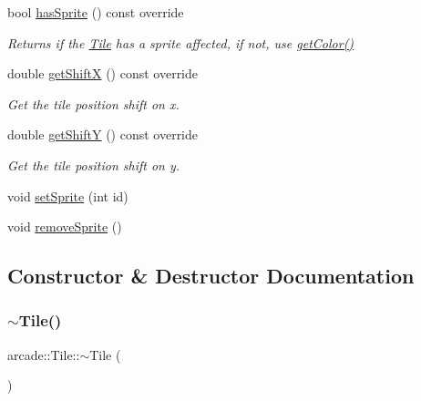 \begin{DoxyCompactItemize}
bool \hyperlink{classarcade_1_1_tile_abb9bfea961e713a36213627d0787aae2}{has\+Sprite} () const override
\begin{DoxyCompactList}\small\item\em Returns if the \hyperlink{classarcade_1_1_tile}{Tile} has a sprite affected, if not, use \hyperlink{classarcade_1_1_tile_a33f158dcb0b991ca565562a41ede70ba}{get\+Color()} \end{DoxyCompactList}\item 
double \hyperlink{classarcade_1_1_tile_a0db817dd3b7e0872e90d703bfea16005}{get\+ShiftX} () const override
\begin{DoxyCompactList}\small\item\em Get the tile position shift on x. \end{DoxyCompactList}\item 
double \hyperlink{classarcade_1_1_tile_aa28fe418563d90bd65e1c58510d28eef}{get\+ShiftY} () const override
\begin{DoxyCompactList}\small\item\em Get the tile position shift on y. \end{DoxyCompactList}\item 
void \hyperlink{classarcade_1_1_tile_a6fbee0e9aec15f1ee8b723776d67d2b4}{set\+Sprite} (int id)
\item 
void \hyperlink{classarcade_1_1_tile_a47d0874b2b1f02719574d1cae49e7a05}{remove\+Sprite} ()
\end{DoxyCompactItemize}


\subsection{Constructor \& Destructor Documentation}
\mbox{\label{classarcade_1_1_tile_a38f5ed9f2ae16dbd42fa736ed5c984a6}} 
\subsubsection{\texorpdfstring{$\sim$\+Tile()}{~Tile()}}
{\footnotesize\ttfamily arcade\+::\+Tile\+::$\sim$\+Tile (\begin{DoxyParamCaption}{ }\end{DoxyParamCaption})\hspace{0.3cm}{\ttfamily [virtual]}}

\mbox{\label{classarcade_1_1_tile_abdc042c12eb8996f38a883c38c98efc6}} 
